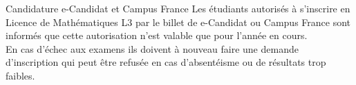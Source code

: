 \documentclass{beamer}
\begin{document}
%
%


 
\begin{frame}%
\begin{alertblock}{Candidature e-Candidat et Campus France}
Les étudiants autorisés à s'inscrire en Licence de Mathématiques L3  par le billet de e-Candidat ou Campus France  sont informés que cette autorisation n'est valable que pour l'année en cours. \\
En cas d'échec aux examens ils doivent à nouveau faire une demande d'inscription qui peut être refusée en cas d'absentéisme ou de résultats trop faibles.
\end{alertblock}
\end{frame}

\end{document}
